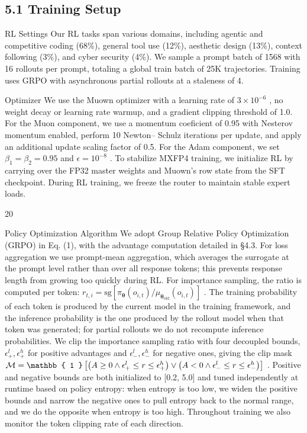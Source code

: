 \documentclass[
  10
]{article}
\begin{document}
\subsection{5.1 Training Setup}\label{training-setup}

RL Settings Our RL tasks span various domains, including agentic and
competitive coding (68\%), general tool use (12\%), aesthetic design
(13\%), context following (3\%), and cyber security (4\%). We sample a
prompt batch of 1568 with 16 rollouts per prompt, totaling a global
train batch of 25K trajectories. Training uses GRPO with asynchronous
partial rollouts at a staleness of 4.

Optimizer We use the Muown optimizer with a learning rate of
\(3 \times 1 0 ^ { - 6 }\) , no weight decay or learning rate warmup,
and a gradient clipping threshold of 1.0. For the Muon component, we use
a momentum coeficient of 0.95 with Nesterov momentum enabled, perform 10
Newton-- Schulz iterations per update, and apply an additional update
scaling factor of 0.5. For the Adam component, we set
\(\beta _ { 1 } = \beta _ { 2 } = 0 . 9 5\) and
\(\epsilon = 1 0 ^ { - 8 }\) . To stabilize MXFP4 training, we
initialize RL by carrying over the FP32 master weights and Muown's row
state from the SFT checkpoint. During RL training, we freeze the router
to maintain stable expert loads.

20

Policy Optimization Algorithm We adopt Group Relative Policy
Optimization (GRPO) in Eq. (1), with the advantage computation detailed
in §4.3. For loss aggregation we use prompt-mean aggregation, which
averages the surrogate at the prompt level rather than over all response
tokens; this prevents response length from growing too quickly during
RL. For importance sampling, the ratio is computed per token:
\(r _ { t , i } = \mathrm { s g } [ \pi _ { \boldsymbol { \theta } } ( o _ { i , t } ) / \mu _ { \boldsymbol { \theta } _ { \mathrm { o l d } } } ( o _ { i , t } ) ]\)
. The training probability of each token is produced by the current
model in the training framework, and the inference probability is the
one produced by the rollout model when that token was generated; for
partial rollouts we do not recompute inference probabilities. We clip
the importance sampling ratio with four decoupled bounds,
\(\epsilon _ { + } ^ { l } , \epsilon _ { + } ^ { h }\) for positive
advantages and \(\epsilon _ { - } ^ { l } , \epsilon _ { - } ^ { h }\)
for negative ones, giving the clip mask
\({ \cal M } = \mathbb { 1 } \left[ \big ( A \ge 0 \land \epsilon _ { + } ^ { l } \le r \le \epsilon _ { + } ^ { h } \big ) \lor \big ( A < 0 \land \epsilon _ { - } ^ { l } \le r \le \epsilon _ { - } ^ { h } \big ) \right]\)
. Positive and negative bounds are both initialized to {[}0.2, 5.0{]}
and tuned independently at runtime based on policy entropy: when entropy
is too low, we widen the positive bounds and narrow the negative ones to
pull entropy back to the normal range, and we do the opposite when
entropy is too high. Throughout training we also monitor the token
clipping rate of each direction.
\end{document}
